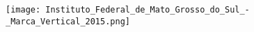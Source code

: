 \begin{center}
	\texttt{[image: Instituto\_Federal\_de\_Mato\_Grosso\_do\_Sul\_-\_Marca\_Vertical\_2015.png]}
	
	\ABNTEXchapterfont\bfseries\large\textsc{\textbf{\imprimirinstituicao}}
	\vspace{1.0cm}
	
	\ABNTEXchapterfont\large\textsc{\textbf{\imprimircurso}}
	\vspace{3.5cm}
	
	\ABNTEXchapterfont\large\textsc{\textbf{\imprimirautor}}
	\vspace{3.5cm}
	
	\ABNTEXchapterfont\large\textsc{\textbf{\imprimirtitulo\ifdef{\osubtitulo}{:}{}}}
	
	\ifdef{\osubtitulo}{\ABNTEXchapterfont\large\textbf{\imprimirsubtitulo}}{}
	\vfill
	
	\SingleSpacing
	\large\textsc{\textbf{\imprimirlocal}}\\
	\large\textsc{\textbf{\imprimirano}}

	
\end{center}

\cleardoublepage